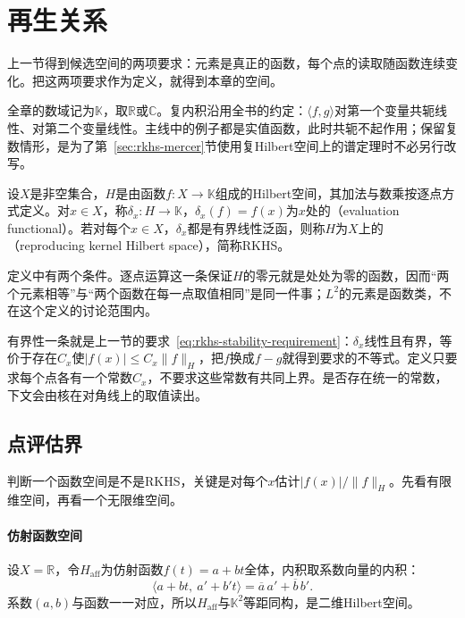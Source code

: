 \section{再生关系}
\label{sec:rkhs-reproducing-relation}

上一节得到候选空间的两项要求：元素是真正的函数，每个点的读取随函数连续变化。把这两项要求作为定义，就得到本章的空间。

全章的数域记为$\mathbb K$，取$\mathbb R$或$\mathbb C$。复内积沿用全书的约定：$\langle f,g\rangle$对第一个变量共轭线性、对第二个变量线性。主线中的例子都是实值函数，此时共轭不起作用；保留复数情形，是为了第~\ref{sec:rkhs-mercer}节使用复Hilbert空间上的谱定理时不必另行改写。

\begin{definition}[再生核Hilbert空间]
\label{def:rkhs-rkhs}
设$X$是非空集合，$H$是由函数$f:X\to\mathbb K$组成的Hilbert空间，其加法与数乘按逐点方式定义。对$x\in X$，称$\delta_x:H\to\mathbb K$，$\delta_x(f)=f(x)$为$x$处的（evaluation functional）。若对每个$x\in X$，$\delta_x$都是有界线性泛函，则称$H$为$X$上的（reproducing kernel Hilbert space），简称RKHS。
\end{definition}

定义中有两个条件。逐点运算这一条保证$H$的零元就是处处为零的函数，因而“两个元素相等”与“两个函数在每一点取值相同”是同一件事；$L^2$的元素是函数类，不在这个定义的讨论范围内。

有界性一条就是上一节的要求~\eqref{eq:rkhs-stability-requirement}：$\delta_x$线性且有界，等价于存在$C_x$使$\lvert f(x)\rvert\leq C_x\lVert f\rVert_H$，把$f$换成$f-g$就得到要求的不等式。定义只要求每个点各有一个常数$C_x$，不要求这些常数有共同上界。是否存在统一的常数，下文会由核在对角线上的取值读出。

\subsection{点评估界}
\label{sec:rkhs-evaluation-bounds}

判断一个函数空间是不是RKHS，关键是对每个$x$估计$\lvert f(x)\rvert/\lVert f\rVert_H$。先看有限维空间，再看一个无限维空间。

\paragraph{仿射函数空间}

设$X=\mathbb R$，令$H_{\mathrm{aff}}$为仿射函数$f(t)=a+bt$全体，内积取系数向量的内积：
\[
\langle a+bt,\ a'+b't\rangle=\overline a\,a'+\overline b\,b' .
\]
系数$(a,b)$与函数一一对应，所以$H_{\mathrm{aff}}$与$\mathbb K^2$等距同构，是二维Hilbert空间。

